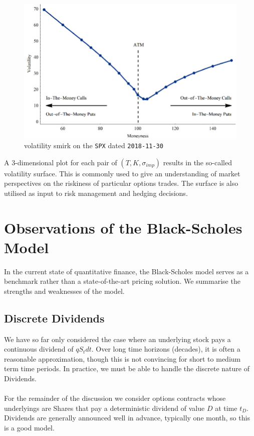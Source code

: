 \documentclass{article}
\def\code#1{\texttt{#1}}
\begin{document}
\begin{figure}[h]
\centering
\includegraphics[scale=0.35]{images/Volatility-smile-SPX-Date-2018-11-17-Expiration-Date-2018-11-30-OTM-puts-are-in-less.png}
\caption{volatility smirk on the \code{SPX} dated \code{2018-11-30}}
\end{figure}

A 3-dimensional plot for each pair of $(T, K, \sigma_{imp})$ results in the so-called volatility surface. This is commonly used to give an understanding of market perspectives on the riskiness of particular options trades. The surface is also utilised  as input to risk management and hedging decisions. 

\newpage
\section{Observations of the Black-Scholes Model}
In the current state of quantitative finance, the Black-Scholes model serves as a benchmark rather than a state-of-the-art pricing solution. We summarise the strengths and weaknesses of the model. 

\subsection{Discrete Dividends}
We have so far only considered the case where an underlying stock pays a continuous dividend of $qS_t dt$. Over long time horizons (decades), it is often a reasonable approximation, though this is not convincing for short to medium term time periods. In practice, we must be able to handle the discrete nature of Dividends. \\
\\
For the remainder of the discussion we consider options contracts whose underlyings are Shares that pay a deterministic dividend of value $D$ at time $t_D$. Dividends are generally announced well in advance, typically one month, so this is a good model. 
\end{document}
